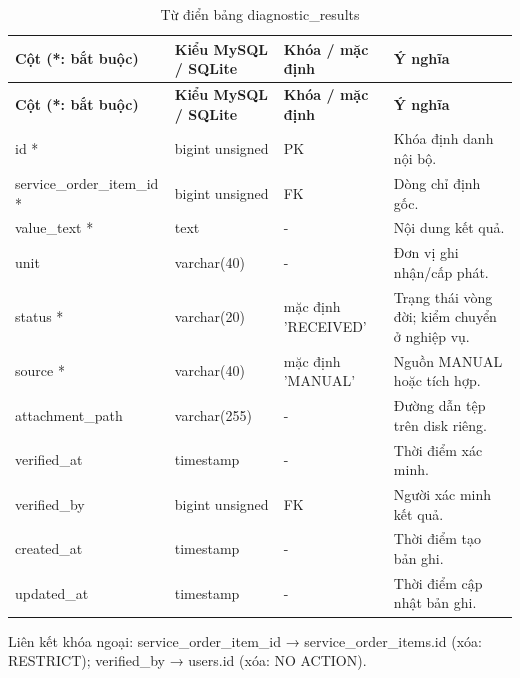 {\fontsize{10}{12}\selectfont\setlength{\tabcolsep}{3pt}\renewcommand{\arraystretch}{1.12}
\begin{longtable}{@{}L{\textwidth-4.86pt\relax} L{\textwidth-3.96pt\relax} L{\textwidth-2.88pt\relax} L{\textwidth-6.3pt\relax}@{}}
\caption{Từ điển bảng diagnostic\_\allowbreak{}results}\\
\toprule
\textbf{Cột (*:\allowbreak{} bắt buộc)} & \textbf{Kiểu My\allowbreak{}SQL /\allowbreak{} SQLite} & \textbf{Khóa /\allowbreak{} mặc định} & \textbf{Ý nghĩa}\\\midrule
\endfirsthead
\toprule
\textbf{Cột (*:\allowbreak{} bắt buộc)} & \textbf{Kiểu My\allowbreak{}SQL /\allowbreak{} SQLite} & \textbf{Khóa /\allowbreak{} mặc định} & \textbf{Ý nghĩa}\\\midrule
\endhead
\bottomrule\endlastfoot
id * & bigint unsigned & PK & Khóa định danh nội bộ.\allowbreak{}\\[1pt]
service\_\allowbreak{}order\_\allowbreak{}item\_\allowbreak{}id * & bigint unsigned & FK & Dòng chỉ định gốc.\allowbreak{}\\[1pt]
value\_\allowbreak{}text * & text & - & Nội dung kết quả.\allowbreak{}\\[1pt]
unit & varchar(40) & - & Đơn vị ghi nhận/\allowbreak{}cấp phát.\allowbreak{}\\[1pt]
status * & varchar(20) & mặc định 'RECEIVED' & Trạng thái vòng đời; kiểm chuyển ở nghiệp vụ.\allowbreak{}\\[1pt]
source * & varchar(40) & mặc định 'MANUAL' & Nguồn MANUAL hoặc tích hợp.\allowbreak{}\\[1pt]
attachment\_\allowbreak{}path & varchar(255) & - & Đường dẫn tệp trên disk riêng.\allowbreak{}\\[1pt]
verified\_\allowbreak{}at & timestamp & - & Thời điểm xác minh.\allowbreak{}\\[1pt]
verified\_\allowbreak{}by & bigint unsigned & FK & Người xác minh kết quả.\allowbreak{}\\[1pt]
created\_\allowbreak{}at & timestamp & - & Thời điểm tạo bản ghi.\allowbreak{}\\[1pt]
updated\_\allowbreak{}at & timestamp & - & Thời điểm cập nhật bản ghi.\allowbreak{}\\[1pt]
\end{longtable}}
Liên kết khóa ngoại:\allowbreak{} service\_\allowbreak{}order\_\allowbreak{}item\_\allowbreak{}id → service\_\allowbreak{}order\_\allowbreak{}items.\allowbreak{}id (xóa:\allowbreak{} RESTRICT); verified\_\allowbreak{}by → users.\allowbreak{}id (xóa:\allowbreak{} NO ACTION).\allowbreak{}

